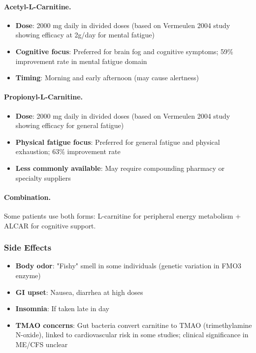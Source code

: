 \paragraph{Acetyl-L-Carnitine.}
\begin{itemize}
    \item \textbf{Dose}: 2000 mg daily in divided doses (based on Vermeulen 2004 study showing efficacy at 2g/day for mental fatigue)~\cite{Vermeulen2004carnitine}
    \item \textbf{Cognitive focus}: Preferred for brain fog and cognitive symptoms; 59\% improvement rate in mental fatigue domain
    \item \textbf{Timing}: Morning and early afternoon (may cause alertness)
\end{itemize}

\paragraph{Propionyl-L-Carnitine.}
\begin{itemize}
    \item \textbf{Dose}: 2000 mg daily in divided doses (based on Vermeulen 2004 study showing efficacy for general fatigue)~\cite{Vermeulen2004carnitine}
    \item \textbf{Physical fatigue focus}: Preferred for general fatigue and physical exhaustion; 63\% improvement rate
    \item \textbf{Less commonly available}: May require compounding pharmacy or specialty suppliers
\end{itemize}

\paragraph{Combination.}
Some patients use both forms: L-carnitine for peripheral energy metabolism + ALCAR for cognitive support.

\subsubsection{Side Effects}

\begin{itemize}
    \item \textbf{Body odor}: "Fishy" smell in some individuals (genetic variation in FMO3 enzyme)
    \item \textbf{GI upset}: Nausea, diarrhea at high doses
    \item \textbf{Insomnia}: If taken late in day
    \item \textbf{TMAO concerns}: Gut bacteria convert carnitine to TMAO (trimethylamine N-oxide), linked to cardiovascular risk in some studies; clinical significance in ME/CFS unclear
\end{itemize}

